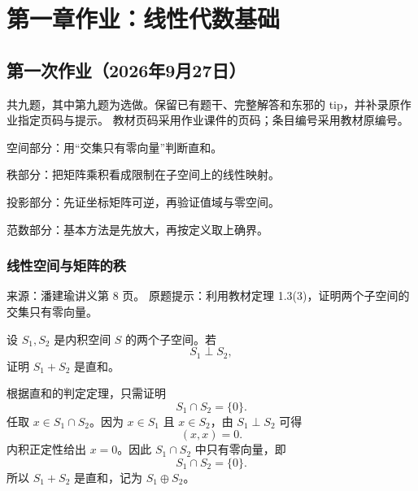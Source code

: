 \begingroup
\chapter*{第一章作业：线性代数基础}
\setcounter{section}{0}
\renewcommand{\thesection}{\arabic{section}}
\renewcommand{\thechapter}{1}
\renewcommand{\theHsection}{homework.linear-algebra.\arabic{section}}

\section{第一次作业（2026年9月27日）}
\label{hw:linear-algebra:first}
\noindent 共九题，其中第九题为选做。保留已有题干、完整解答和东邪的 tip，并补录原作业指定页码与提示。
教材页码采用作业课件的页码；条目编号采用教材原编号。

\begin{introduction}[这一章在做什么]
  \item 空间部分：用“交集只有零向量”判断直和。
  \item 秩部分：把矩阵乘积看成限制在子空间上的线性映射。
  \item 投影部分：先证坐标矩阵可逆，再验证值域与零空间。
  \item 范数部分：基本方法是先放大，再按定义取上确界。
\end{introduction}

\subsection*{线性空间与矩阵的秩}

\begin{homework}[第 1 题：定理 1.5]
\par\smallskip\textsf{来源：潘建瑜讲义第 8 页。}
原题提示：利用教材定理 1.3(3)，证明两个子空间的交集只有零向量。\par\smallskip

设 $S_1,S_2$ 是内积空间 $S$ 的两个子空间。若
\[
S_1\perp S_2,
\]
证明 $S_1+S_2$ 是直和。
\end{homework}

\begin{solution}
根据直和的判定定理，只需证明
\[
S_1\cap S_2=\{0\}.
\]
任取 $x\in S_1\cap S_2$。因为 $x\in S_1$ 且 $x\in S_2$，由 $S_1\perp S_2$ 可得
\[
(x,x)=0.
\]
内积正定性给出 $x=0$。因此 $S_1\cap S_2$ 中只有零向量，即
\[
S_1\cap S_2=\{0\}.
\]
所以 $S_1+S_2$ 是直和，记为 $S_1\oplus S_2$。
\end{solution}

